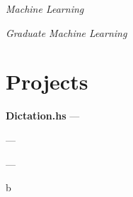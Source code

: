 \documentclass[margin,line]{resume}
\begin{document}
\begin{resume}
        \textsl{Machine Learning} \par\vspace{-4mm}%
    {\addtolength{\leftskip}{2 mm}       
    \par}
   
       \textsl{Graduate Machine Learning} \par\vspace{-1mm}%
    {\addtolength{\leftskip}{2 mm}       
    \par}



    \section{\mysidestyle{} Projects}

    \textbf{Dictation.hs}  \hfill  —  \par\vspace{-4.0mm}   
           {\addtolength{\leftskip}{2 mm}
             
             \par
           }
           
    \textbf{}  \hfill  —  \par\vspace{-4.0mm}   
           {\addtolength{\leftskip}{2 mm}
             
             \par
           }

    \textbf{}  \hfill  —  \par\vspace{-4.0mm}   
           {\addtolength{\leftskip}{2 mm}
             
             \par
           }
           
b
           





\end{resume}
\end{document}
